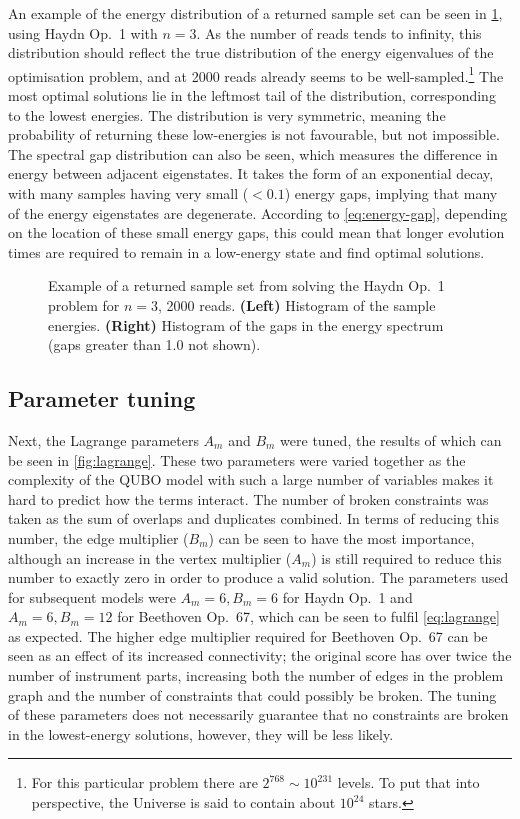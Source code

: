 \documentclass[12pt]{article}
\theoremstyle{definition}
\begin{document}
An example of the energy distribution of a returned sample set can be seen in \cref{fig:histograms}, using Haydn Op.\ 1 with $n=3$. As the number of reads tends to infinity, this distribution should reflect the true distribution of the energy eigenvalues of the optimisation problem, and at \num{2000} reads already seems to be well-sampled.\footnote{For this particular problem there are $2^{768}\sim 10^{231}$ levels. To put that into perspective, the Universe is said to contain about $10^{24}$ stars.} The most optimal solutions lie in the leftmost tail of the distribution, corresponding to the lowest energies. The distribution is very symmetric, meaning the probability of returning these low-energies is not favourable, but not impossible.
The spectral gap distribution can also be seen, which measures the difference in energy between adjacent eigenstates. It takes the form of an exponential decay, with many samples having very small ($<0.1$) energy gaps, implying that many of the energy eigenstates are degenerate. According to \cref{eq:energy-gap}, depending on the location of these small energy gaps, this could mean that longer evolution times are required to remain in a low-energy state and find optimal solutions.

\begin{figure}[h]
    \centering\footnotesize
    
    \caption{Example of a returned sample set from solving the Haydn Op.\ 1 problem for $n=3$, \num{2000} reads. \textbf{(Left)} Histogram of the sample energies. \textbf{(Right)} Histogram of the gaps in the energy spectrum (gaps greater than \num{1.0} not shown).}
    \label{fig:histograms}
\end{figure}

\subsection{Parameter tuning}

Next, the Lagrange parameters $A_m$ and $B_m$ were tuned, the results of which can be seen in \cref{fig:lagrange}. These two parameters were varied together as the complexity of the QUBO model with such a large number of variables makes it hard to predict how the terms interact. The number of broken constraints was taken as the sum of overlaps and duplicates combined. In terms of reducing this number, the edge multiplier ($B_m$) can be seen to have the most importance, although an increase in the vertex multiplier ($A_m$) is still required to reduce this number to exactly zero in order to produce a valid solution. The parameters used for subsequent models were $A_m=6,B_m=6$ for Haydn Op.\ 1 and $A_m=6,B_m=12$ for Beethoven Op.\ 67, which can be seen to fulfil \cref{eq:lagrange} as expected. The higher edge multiplier required for Beethoven Op.\ 67 can be seen as an effect of its increased connectivity; the original score has over twice the number of instrument parts, increasing both the number of edges in the problem graph and the number of constraints that could possibly be broken. The tuning of these parameters does not necessarily guarantee that no constraints are broken in the lowest-energy solutions, however, they will be less likely.
\end{document}
